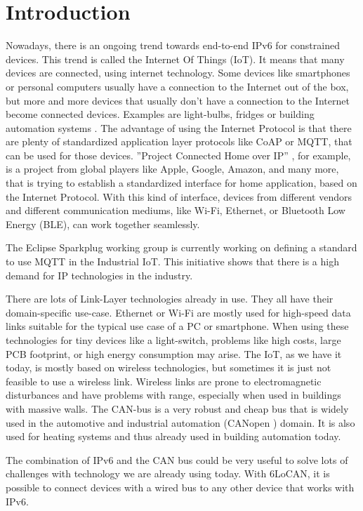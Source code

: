 
\chapter{Introduction}
\label{cha:introduction}

Nowadays, there is an ongoing trend towards end-to-end IPv6 for constrained devices.
This trend is called the Internet Of Things (IoT). It means that many devices are connected,
using internet technology. Some devices like smartphones or personal computers usually have a connection to the Internet out of the box,
but more and more devices that usually don’t have a connection to the Internet become connected devices. Examples are light-bulbs, fridges or
building automation systems \cite{6296937}.
The advantage of using the Internet Protocol is that there are plenty of standardized application layer protocols like CoAP or MQTT,
that can be used for those devices. ”Project Connected Home over IP” \cite{connhome}, for example, is a project from global players like
Apple, Google, Amazon, and many more, that is trying to establish a standardized interface for home application, based on the Internet Protocol.
With this kind of interface, devices from different vendors and different communication mediums, like Wi-Fi, Ethernet, or Bluetooth Low Energy (BLE),
can work together seamlessly.

The Eclipse Sparkplug working group \cite{sparkplug} is currently working on defining a standard to use MQTT in the Industrial IoT.
This initiative shows that there is a high demand for IP technologies in the industry.

There are lots of Link-Layer technologies already in use. They all have their domain-specific use-case.
Ethernet or Wi-Fi are mostly used for high-speed data links suitable for the typical use case of a PC or smartphone.
When using these technologies for tiny devices like a light-switch, problems like high costs, large PCB footprint, or high energy consumption may arise.
The IoT, as we have it today, is mostly based on wireless technologies, but sometimes it is just not feasible to use a wireless link.
Wireless links are prone to electromagnetic disturbances and have problems with range, especially when used in buildings with massive walls.
The CAN-bus is a very robust and cheap bus that is widely used in the automotive and industrial automation (CANopen \cite{canopen}) domain.
It is also used for heating systems and thus already used in building automation today.

The combination of IPv6 and the CAN bus could be very useful to solve lots of challenges with technology we are already using today.
With 6LoCAN, it is possible to connect devices with a wired bus to any other device that works with IPv6.
